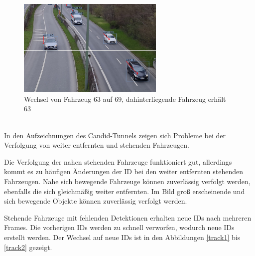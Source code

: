 \documentclass[conference]{IEEEtran}
\begin{document}
	\begin{figure}[!h]
		\begin{center}
			\includegraphics[width=7cm]{Media/switch4.jpg}
			\caption{Wechsel von Fahrzeug 63 auf 69, dahinterliegende Fahrzeug erhält 63}
			\label{track6}
		\end{center}
	\end{figure}\\
	In den Aufzeichnungen des Candid-Tunnels zeigen sich Probleme bei der Verfolgung von weiter entfernten und stehenden Fahrzeugen.
	
	Die Verfolgung der nahen stehenden Fahrzeuge funktioniert gut, allerdings kommt es zu
	häufigen Änderungen der ID bei den weiter entfernten stehenden Fahrzeugen.
	Nahe sich bewegende Fahrzeuge können zuverlässig verfolgt werden, ebenfalls die sich gleichmäßig weiter entfernten. Im Bild groß erscheinende und sich bewegende Objekte können zuverlässig verfolgt werden.
	
	Stehende Fahrzeuge mit fehlenden Detektionen erhalten neue IDs nach mehreren
	Frames. Die vorherigen IDs werden zu schnell verworfen, wodurch neue IDs erstellt werden.
	Der Wechsel auf neue IDs ist in den Abbildungen \ref{track1} bis \ref{track2} 
	gezeigt.
	
\end{document}
